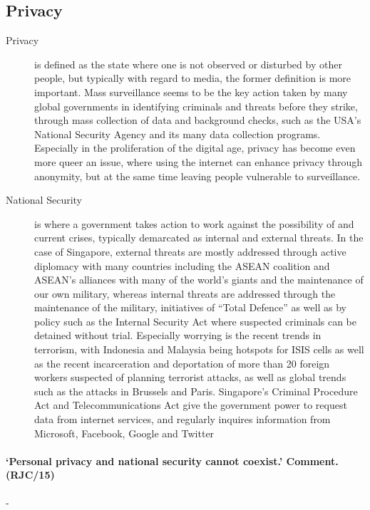 \documentclass[../../main]{subfiles}
\begin{document}
\subsection{Privacy}

\begin{description}
	\item[Privacy] is defined as the state where one is not observed or disturbed by other people, but typically with regard to media, the former definition is more important. Mass surveillance seems to be the key action taken by many global governments in identifying criminals and threats before they strike, through mass collection of data and background checks, such as the USA's National Security Agency and its many data collection programs. Especially in the proliferation of the digital age, privacy has become even more queer an issue, where using the internet can enhance privacy through anonymity, but at the same time leaving people vulnerable to surveillance.
	\item[National Security] is where a government takes action to work against the possibility of and current crises, typically demarcated as internal and external threats. In the case of Singapore, external threats are mostly addressed through active diplomacy with many countries including the ASEAN coalition and ASEAN's alliances with many of the world's giants and the maintenance of our own military, whereas internal threats are addressed through the maintenance of the military, initiatives of ``Total Defence'' as well as by policy such as the Internal Security Act where suspected criminals can be detained without trial. Especially worrying is the recent trends in terrorism, with Indonesia and Malaysia being hotspots for ISIS cells as well as the recent incarceration and deportation of more than 20 foreign workers suspected of planning terrorist attacks, as well as global trends such as the attacks in Brussels and Paris. Singapore's Criminal Procedure Act and Telecommunications Act give the government power to request data from internet services, and regularly inquires information from Microsoft, Facebook, Google and Twitter
\end{description}

\paragraph{`Personal privacy and national security cannot coexist.' Comment. (RJC/15)}-
\end{document}
